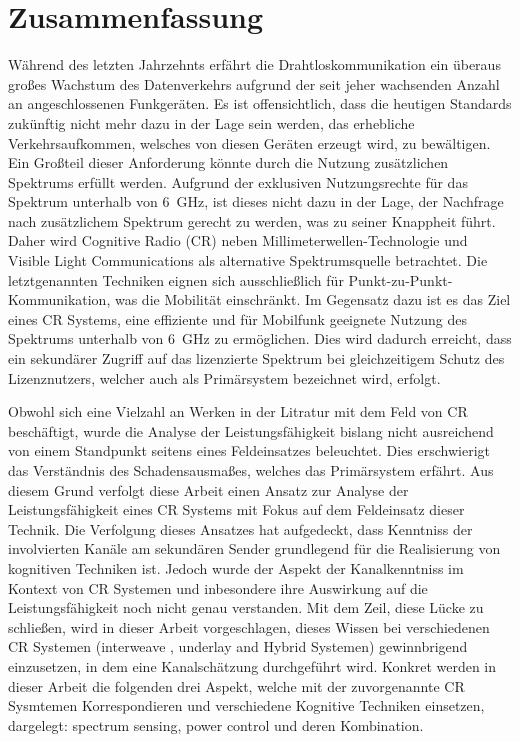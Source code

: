 \chapter*{Zusammenfassung}
W\"ahrend des letzten Jahrzehnts erf\"ahrt die Drahtloskommunikation ein \"uberaus gro\ss es Wachstum des Datenverkehrs aufgrund der seit jeher wachsenden Anzahl an angeschlossenen Funkger\"aten. Es ist offensichtlich, dass die heutigen Standards zuk\"unftig nicht mehr dazu in der Lage sein werden, das erhebliche Verkehrsaufkommen, welsches von diesen Ger\"aten erzeugt wird, zu bew\"altigen. Ein Gro\ss teil dieser Anforderung k\"onnte durch die Nutzung zus\"atzlichen Spektrums erf\"ullt werden. Aufgrund der exklusiven Nutzungsrechte f\"ur das Spektrum unterhalb von \SI{6}{GHz}, ist dieses nicht dazu in der Lage, der Nachfrage nach zus\"atzlichem Spektrum gerecht zu werden, was zu seiner Knappheit f\"uhrt. Daher wird Cognitive Radio (CR) neben Millimeterwellen-Technologie und Visible Light Communications als alternative Spektrumsquelle betrachtet. Die letztgenannten Techniken eignen sich ausschlie\ss lich f\"ur Punkt-zu-Punkt-Kommunikation, was die Mobilit\"at einschr\"ankt. Im Gegensatz dazu ist es das Ziel eines CR Systems, eine effiziente und f\"ur Mobilfunk geeignete Nutzung des Spektrums unterhalb von \SI{6}{GHz} zu erm\"oglichen. Dies wird dadurch erreicht, dass ein sekund\"arer Zugriff auf das lizenzierte Spektrum bei gleichzeitigem Schutz des Lizenznutzers, welcher auch als Prim\"arsystem bezeichnet wird, erfolgt. 

Obwohl sich eine Vielzahl an Werken in der Litratur mit dem Feld von CR beschäftigt, wurde die Analyse der Leistungsfähigkeit bislang nicht ausreichend von einem Standpunkt seitens eines Feldeinsatzes beleuchtet. Dies erschwierigt das Verständnis des Schadensausmaßes, welches das Primärsystem erfährt. Aus diesem Grund verfolgt diese Arbeit einen Ansatz zur Analyse der Leistungsfähigkeit eines CR Systems mit Fokus auf dem Feldeinsatz dieser Technik. Die Verfolgung dieses Ansatzes hat aufgedeckt, dass Kenntniss der involvierten Kanäle am sekundären Sender grundlegend für die Realisierung von kognitiven Techniken ist. Jedoch wurde der Aspekt der Kanalkenntniss im Kontext von CR Systemen und inbesondere ihre Auswirkung auf die Leistungsfähigkeit noch nicht genau verstanden. Mit dem Zeil, diese Lücke zu schlie\ss en, wird in dieser Arbeit vorgeschlagen, dieses Wissen bei verschiedenen CR Systemen (interweave , underlay and Hybrid Systemen) gewinnbrigend einzusetzen, in dem eine Kanalsch\"atzung durchgef\"uhrt wird. Konkret werden in dieser Arbeit die folgenden drei Aspekt, welche mit der zuvorgenannte CR Sysmtemen Korrespondieren und verschiedene Kognitive Techniken einsetzen, dargelegt: spectrum sensing, power control und deren Kombination.

